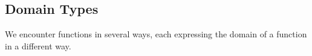 \documentclass{ximera}
\begin{document}
\subsection*{Domain Types}

We encounter functions in several ways, each expressing the domain of a function in a different way.
\end{document}
